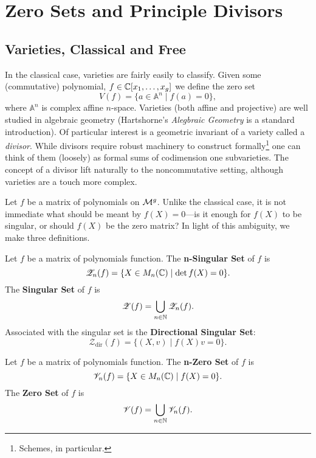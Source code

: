 \chapter{Zero Sets and Principle Divisors}\label{ch:ZeroDiv}

\section{Varieties, Classical and Free}%
\label{sec:varieties}

In the classical case, varieties are fairly easily to classify. Given some
(commutative) polynomial, \(f \in \mathbb{C} [x_1, \dots, x_g]\) we define the zero set
\[
  V(f) = \{a \in \mathbb{A}^n \mid  f(a) =0\},
\]
where \(\mathbb{A}^n\) is complex affine \(n\)-space.  Varieties (both affine and
projective) are well studied in algebraic geometry
(Hartshorne's \emph{Alegbraic Geometry} \cite{hartshorneAlgebraic2008} is a
standard introduction). Of particular interest is a geometric invariant of a
variety called a \emph{divisor}. While divisors require robust machinery to
construct formally\footnote{Schemes, in particular.} one can think of them
(loosely) as formal sums of codimension one subvarieties. The concept of a
divisor lift naturally to the noncommutative setting, although varieties are
a touch more complex.

Let \(f\) be a matrix of polynomials on \(\mathcal{M}^{g} \).
Unlike the classical case, it is not immediate what should be meant by
\(f(X)=0\)---is it enough for \(f(X)\) to be singular, or should \(f(X)\) be the
zero matrix? In light of this ambiguity, we make three definitions.
\begin{definition}%
\label{def:singularset}
  Let \(f\) be a matrix of polynomials function. The \textbf{n-Singular Set} of \(f\) is
  \[
    \mathscr{Z}_n(f) = \{X \in M_n (\mathbb{C}) \mid \det f(X) =0\}.
  \]
  The \textbf{Singular Set} of \(f\) is
  \[
    \mathscr{Z}(f) = \bigcup_{n \in \mathbb{N} } \mathscr{Z}_n(f).
  \]
  Associated with the singular set is the \textbf{Directional Singular Set}:
  \[
    \mathscr{Z}_{\textrm{dir}}(f) = \{(X,v) \mid f(X)v = 0\}.
  \]
\end{definition}

\begin{definition}%
\label{def:zeroset}
  Let \(f\) be a matrix of polynomials function. The \textbf{n-Zero Set} of \(f\) is
  \[
    \mathscr{V}_n(f) = \{X \in M_n (\mathbb{C}) \mid f(X) =0\}.
  \]
  The \textbf{Zero Set} of \(f\) is
  \[
    \mathscr{V}(f) = \bigcup_{n \in \mathbb{N} } \mathscr{V}_n(f).
  \]
\end{definition}

